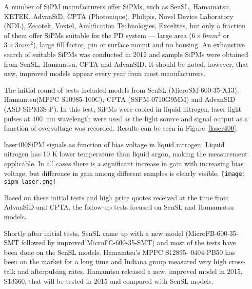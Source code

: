 A number of SiPM manufacturers offer SiPMs, such as SenSL,
Hamamatsu, KETEK, AdvanSiD, CPTA (Photonique), Philipis, Novel Device
Laboratory (NDL), Zecotek, Voxtel, Amlification Technologies,
Excelites, %
but only a fraction of them offer SiPMs 
suitable for the PD system --- large area ($6\times6 mm^2$ or $3\times3 mm^2$), large fill
factor, pin or surface mount and no housing. An
exhaustive search of suitable SiPMs was conducted in 2012 and
sample SiPMs were obtained from SenSL, Hamamtsu, CPTA and
AdvanSID. It should be noted, however, that 
new, improved models appear every year from most manufacturers.

The initial round of
tests included models from SenSL (MicroSM-600-35-X13), Hamamtsu(MPPC
S10985-100C), CPTA (SSPM-0710G9MM) and AdvanSID (ASD-SiPM3S-P).
In
this test, SiPMs were cooled in liquid nitrogen, laser light pulses at 400~nm
wavelength were used as the light source and signal output as a
function of overvoltage was recorded. Results can be seen in Figure~\ref{laser400}.

\begin{cdrfigure}{laser400}{SiPM signals as function of bias voltage in
    liquid nitrogen. Liquid nitrogen has 10 K lower temperature than
    liquid argon, making the measurement applicable. In all cases
    there is a significant increase in gain with increasing bias
    voltage, but difference in gain among different samples is clearly
    visible.} 
  \texttt{[image: sipm\_laser.png]}
\end{cdrfigure}

Based on these initial tests and high price
quotes received at the time from AdvanSiD and CPTA, the follow-up tests focused on SenSL and
Hamamatsu models.  %

Shortly after initial tests, SenSL came up with a new model
(MicroFB-600-35-SMT followed by improved MicroFC-600-35-SMT) and most
of the tests  have been done on the SenSL models. Hamamtsu’s MPPC
S12895- 0404-PB50 has been on the market for a long time and Indiana
group measured very high cross-talk and afterpulsing rates.  Hamamtsu
released a new, improved model in 2015, S13360, that will be
tested in 2015 and compared with SenSL models.

